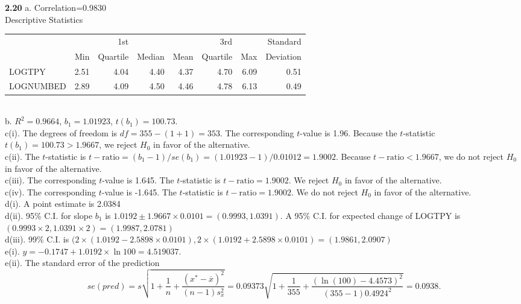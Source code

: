 \textbf{2.20}
a. Correlation=0.9830\\
Descriptive Statistics
\begin{table}[hb]
   \begin{tabular}{lrrrrrrr}
   \hline
         &   & 1st  &   &    & 3rd  &   & Standard \\
         & Min  & Quartile  & Median & Mean  & Quartile & Max   & Deviation
         \\\hline
   LOGTPY   & 2.51 &  4.04 & 4.40 & 4.37 & 4.70 & 6.09 & 0.51 \\
   LOGNUMBED & 2.89    & 4.09 & 4.50    & 4.46 & 4.78 & 6.13   & 0.49 \\
   \hline
   \end{tabular}
\end{table}\\
b. $R^2 = 0.9664$,  $b_1 = 1.01923$, $t(b_1) = 100.73$.\\
c(i).  The degrees of freedom is $df = 355 - (1+1) = 353$. The
corresponding $t$-value is 1.96. Because the $t$-statistic  $t(b_1)
= 100.73 > 1.9667$, we reject $H_0$ in favor of the alternative.\\
c(ii). The $t$-statistic is $t - \mathrm{ratio} = (b_1 - 1)/se(b_1)
= (1.01923 - 1)/0.01012
 = 1.9002.$ Because $t-\mathrm{ratio} < 1.9667$, we do not reject $H_0$ in favor of the alternative.\\
c(iii). The corresponding $t$-value is 1.645. The $t$-statistic is
$t - \mathrm{ratio} = 1.9002.$
We reject $H_0$ in favor of the alternative.\\
c(iv). The corresponding $t$-value is -1.645. The $t$-statistic is
$t - \mathrm{ratio} = 1.9002.$ We do
not reject $H_0$ in favor of the alternative.\\
d(i). A point estimate is 2.0384\\
d(ii). 95\% C.I. for slope $b_1$ is $1.0192 \pm 1.9667 \times 0.0101
= (0.9993, 1.0391)$. A 95\% C.I. for expected change of LOGTPY is
$(0.9993 \times
2, 1.0391 \times 2) = (1.9987, 2.0781)$\\
d(iii). 99\% C.I. is $(2\times(1.0192 - 2.5898\times 0.0101),
2\times(1.0192 + 2.5898\times 0.0101)
=(1.9861, 2.0907) $\\
e(i). $\widehat{y} = -0.1747 + 1.0192 \times \ln 100 = 4.519037.$ \\
e(ii). The standard error of the prediction\begin{equation*}
 se(pred) = s \sqrt{1+\frac{1}{n}+\frac{\left( x^{\ast }-\overline{x}\right) ^{2}
}{(n-1)s_{x}^{2}}} =
0.09373 \sqrt{1+\frac{1}{355}+\frac{\left( \ln(100)-4.4573\right) ^{2}
}{(355-1)0.4924^{2}}}=0.0938.
\end{equation*} \\
